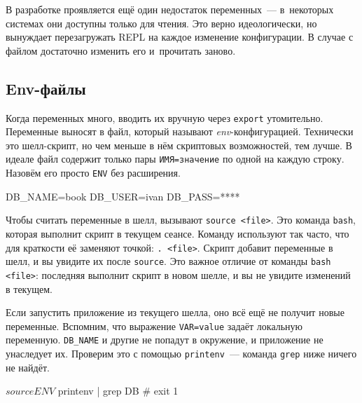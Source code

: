 В разработке проявляется ещё один недостаток переменных~--- в~некоторых системах
они доступны только для чтения. Это верно идеологически, но вынуждает
перезагружать REPL на каждое изменение конфигурации. В случае с файлом
достаточно изменить его и~прочитать заново.

\subsection{Env-файлы}


Когда переменных много, вводить их вручную через \verb|export|
утомительно. Переменные выносят в файл, который называют
\emph{env}-кон\-фи\-гу\-ра\-цией. Технически это шелл-скрипт, но чем меньше в
нём скриптовых возможностей, тем лучше. В идеале файл содержит только пары
\verb|ИМЯ=значение| по одной на каждую строку. Назовём его просто \verb|ENV| без
расширения.

\begin{english}
  \begin{bash}
DB_NAME=book
DB_USER=ivan
DB_PASS=****
  \end{bash}
\end{english}

Чтобы считать переменные в шелл, вызывают \verb|source <file>|. Это команда
\verb|bash|, которая выполнит скрипт в текущем сеансе. Команду используют так
часто, что для краткости её заменяют точкой: \verb|. <file>|. Скрипт добавит
переменные в шелл, и вы увидите их после \verb|source|. Это важное отличие от
команды \verb|bash <file>|: последняя выполнит скрипт в новом шелле, и вы не
увидите изменений в текущем.

\begin{english}
\end{english}

Если запустить приложение из текущего шелла, оно всё ещё не получит новые
переменные. Вспомним, что выражение \verb|VAR=value| задаёт локальную
переменную. \verb|DB_NAME| и другие не попадут в окружение, и приложение не
унаследует их. Проверим это с помощью \verb|printenv|~--- команда \verb|grep|
ниже ничего не найдёт.


\begin{english}
  \begin{bash}
$ source ENV
$ printenv | grep DB
# exit 1
  \end{bash}
\end{english}


